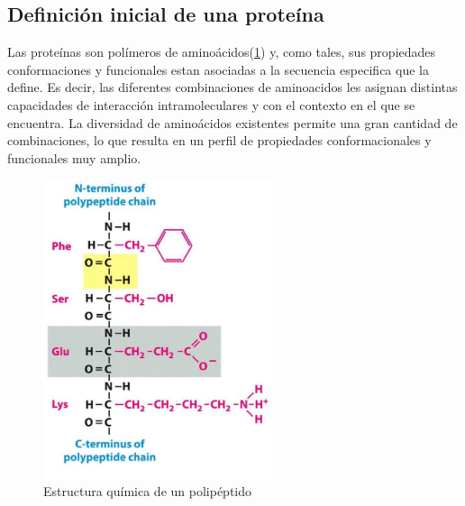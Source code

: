\subsection{Definición inicial de una proteína}
Las proteínas son polímeros de aminoácidos(\ref{polipeptidoEstructura}) y, como tales, sus propiedades conformaciones y funcionales estan asociadas a la secuencia especifica que la define.
Es decir, las diferentes combinaciones de aminoacidos les asignan distintas capacidades de interacción intramoleculares y con el contexto en el que se encuentra.
La diversidad de aminoácidos existentes permite una gran cantidad de combinaciones, lo que resulta en un perfil de propiedades conformacionales y funcionales muy amplio.

\begin{figure}[htbp,centered]
\centering
\includegraphics[width=0.6\textwidth]{img/polipeptidoStructure.jpg} 
\caption{Estructura química de un polipéptido} 
\label{polipeptidoEstructura}
\end{figure}



